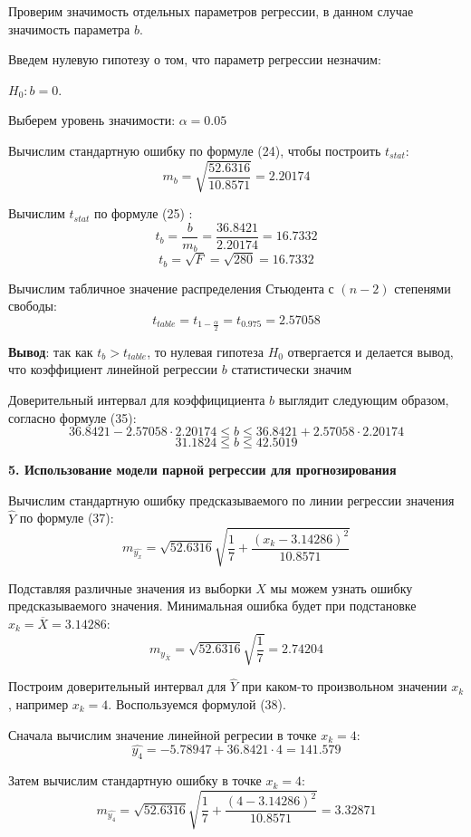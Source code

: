 \documentclass[aps,%
12pt,%
final,%
oneside,
onecolumn,%
musixtex, %
superscriptaddress,%
centertags]{article} %
\begin{document}
Проверим значимость отдельных параметров регрессии, в данном случае значимость параметра $b$.

Введем нулевую гипотезу о том, что параметр регрессии незначим:
\begin{center} $H_0: b=0$. \end{center}

Выберем уровень значимости: $\alpha = 0.05$

Вычислим стандартную ошибку по формуле (24), чтобы построить $t_{stat}$:
$$ m_b = \sqrt { \frac{52.6316}{10.8571}} = 2.20174 $$

Вычислим $t_{stat}$ по формуле (25) :
$$t_b = \frac{b}{m_b} = \frac{36.8421}{2.20174} = 16.7332 $$
$$t_b = \sqrt {F} = \sqrt{280} = 16.7332 $$

Вычислим табличное значение распределения Стьюдента с $(n-2)$ степенями свободы:
$$ t_{table} = t_{1 - \frac{\alpha}{2}} = t_{0.975} = 2.57058$$  

\textbf{Вывод}: так как $t_b > t_{table}$, то нулевая гипотеза $H_0$ отвергается и делается вывод, что коэффициент линейной регрессии $b$ статистически значим

Доверительный интервал для коэффицициента $b$ выглядит следующим образом, согласно формуле (35):
$$36.8421 - 2.57058 \cdot 2.20174 \leq b \leq 36.8421 + 2.57058 \cdot 2.20174  $$
$$31.1824 \leq b \leq 42.5019 $$

\begin{center}
\textbf{5. Использование модели парной регрессии для прогнозирования} 
\end{center}

Вычислим стандартную ошибку предсказываемого по линии регрессии значения $\hat{Y}$ по формуле (37):
$$ m_{\widehat{y_x}} = \sqrt{52.6316} \sqrt{\frac{1}{7} + \frac{(x_k-3.14286)^2}{10.8571}} $$

Подставляя различные значения из выборки $X$ мы можем узнать ошибку предсказываемого значения. Минимальная ошибка будет при подстановке $x_k = \overline{X}=3.14286$:
$$ m_{y_{\overline{X}}} = \sqrt{52.6316} \sqrt{\frac{1}{7}} = 2.74204$$

Построим доверительный интервал для $\widehat{Y}$ при каком-то произвольном значении $x_k$, например $x_k = 4$. Воспользуемся формулой (38).

Сначала вычислим значение линейной регресии в точке $x_k=4$:
$$ \widehat{y_{4}} = -5.78947 + 36.8421\cdot4 = 141.579$$

Затем вычислим стандартную ошибку в точке $x_k=4$:
$$ m_{\widehat{y_4}} = \sqrt{52.6316} \sqrt{\frac{1}{7} + \frac{(4-3.14286)^2}{10.8571}} = 3.32871$$
\end{document}
